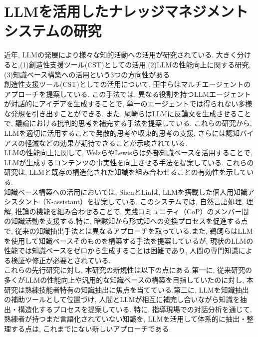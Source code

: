 \section{LLMを活用したナレッジマネジメントシステムの研究}
近年, LLMの発展により様々な知的活動への活用が研究されている. 大きく分けると,(1)創造性支援ツール(CST)としての活用,(2)LLMの性能向上に関する研究, (3)知識ベース構築への活用という3つの方向性がある.\\

創造性支援ツール(CST)としての活用について, 田中らはマルチエージェントのアプローチを提案している\cite{Tanaka2024}. この手法では, 異なる役割を持つLLMエージェントが対話的にアイデアを生成することで, 単一のエージェントでは得られない多様な発想を引き出すことができる. また, 尾崎らはLLMに反論文を生成させることで, 議論における批判的思考を補完する手法を提案している\cite{Ozaki2024}. これらの研究から, LLMを適切に活用することで発散的思考や収束的思考の支援, さらには認知バイアスの軽減などの効果が期待できることが示唆されている.\\

LLMの性能向上に関して, WelzらやLewisらは外部知識ベースを活用することで, LLMが生成するコンテンツの事実性を向上させる手法を提案している\cite{Welz2024, Lewis2020}. これらの研究は, LLMと既存の構造化された知識を組み合わせることの有効性を示している.\\

知識ベース構築への活用においては, ShenとLin\cite{Shen2024}は, LLMを搭載した個人用知識アシスタント（K-assistant）を提案している. このシステムでは, 自然言語処理, 理解, 推論の機能を組み合わせることで, 実践コミュニティ（CoP）のメンバー間の知識活動を支援する.特に, 暗黙知から形式知への変換プロセスを促進する点で, 従来の知識抽出手法とは異なるアプローチを取っている.また, 鵜飼らはLLMを使用して知識ベースそのものを構築する手法を提案している\cite{Ukai2023}が, 現状のLLMの性能では知識ベースをゼロから生成することは困難であり, 人間の専門知識による検証や修正が必要とされている.\\

これらの先行研究に対し, 本研究の新規性は以下の点にある.第一に, 従来研究の多くがLLMの性能向上や汎用的な知識ベースの構築を目指していたのに対し, 本研究は熟練技能者特有の知識抽出に焦点を当てている.第二に, LLMを知識抽出の補助ツールとして位置づけ, 人間とLLMが相互に補完し合いながら知識を抽出・構造化するプロセスを提案している. 特に, 指導現場での対話分析を通じて, 熟練者が持つまだ言語化されていない知識を, LLMを活用して体系的に抽出・整理する点は, これまでにない新しいアプローチである. \\
